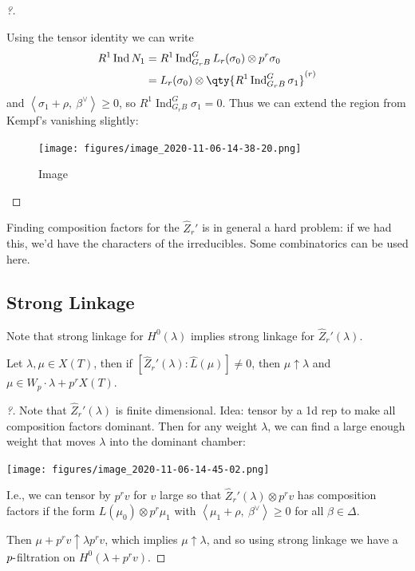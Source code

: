 \begin{proof}[?]
\begin{warnings}
\end{warnings}

Using the tensor identity we can write
\begin{align*}  
R^1 \operatorname{Ind}N_1
&= R^1 \operatorname{Ind}_{G_r B}^G L_r(\sigma_0) \otimes p^r \sigma_0 \\
&= L_r(\sigma_0) \otimes\qty{R^1 \operatorname{Ind}_{G_r B}^G \sigma_1 }^{(r)}
\end{align*}
and
\({\left\langle {\sigma_1 + \rho},~{\beta^\vee} \right\rangle} \geq 0\),
so \(R^1 \operatorname{Ind}_{G_r B}^G \sigma_1 = 0\). Thus we can extend
the region from Kempf's vanishing slightly:

\begin{figure}
\centering
\texttt{[image: figures/image\_2020-11-06-14-38-20.png]}
\caption{Image}
\end{figure}

\end{proof}

Finding composition factors for the \(\widehat{Z}_r'\) is in general a
hard problem: if we had this, we'd have the characters of the
irreducibles. Some combinatorics can be used here.

\hypertarget{strong-linkage-1}{%
\subsection{Strong Linkage}\label{strong-linkage-1}}

Note that strong linkage for \(H^0(\lambda)\) implies strong linkage for
\(\widehat{Z}_r'(\lambda)\).

\begin{theorem}[?]

Let \(\lambda, \mu \in X(T)\), then if
\([\widehat{Z}_r'(\lambda): \widehat{L}(\mu)] \neq 0\), then
\(\mu\uparrow\lambda\) and \(\mu\in W_p\cdot\lambda + p^r X(T)\).

\end{theorem}

\begin{proof}[?]

Note that \(\widehat{Z}_r'(\lambda)\) is finite dimensional. Idea:
tensor by a 1d rep to make all composition factors dominant. Then for
any weight \(\lambda\), we can find a large enough weight that moves
\(\lambda\) into the dominant chamber:

\texttt{[image: figures/image\_2020-11-06-14-45-02.png]}

I.e., we can tensor by \(p^r v\) for \(v\) large so that
\(\widehat{Z}_r'(\lambda) \otimes p^r v\) has composition factors if the
form \(L(\mu_0) \otimes p^r \mu_1\) with
\({\left\langle {\mu_1 + \rho},~{\beta^\vee} \right\rangle} \geq 0\) for
all \(\beta\in\Delta\).

Then \(\mu + p^r v \uparrow \lambda p^r v\), which implies
\(\mu\uparrow \lambda\), and so using strong linkage we have a
\(p{\hbox{-}}\)filtration on \(H^0(\lambda + p^r v)\).

\end{proof}

